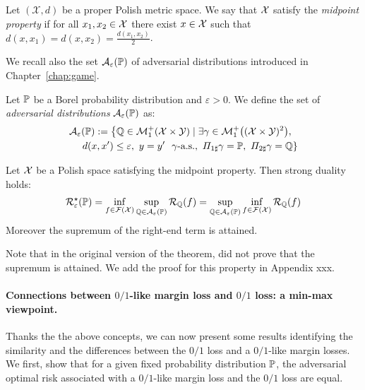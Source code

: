 \begin{definition}
Let $(\mathcal{X},d)$ be a proper Polish metric space. We say that $\mathcal{X}$ satisfy the \emph{midpoint property} if for all $x_1,x_2\in\mathcal{X}$ there exist $x\in\mathcal{X}$ such that $d(x,x_1) = d(x,x_2) =\frac{d(x_1,x_2)}{2}$.
\end{definition}
We recall also the set $\mathcal{A}_\varepsilon(\mathbb{P})$ of adversarial distributions introduced in Chapter~\ref{chap:game}.
\begin{definition}
Let $\mathbb{P}$ be a Borel probability distribution and $\varepsilon>0$.
We define the set of \emph{adversarial distributions} $\mathcal{A}_\varepsilon(\mathbb{P})$ as: 
\begin{align*}
\mathcal{A}_{\varepsilon}&(\PP) := \left\{\QQ\in\mathcal{M}^+_1(\mathcal{X}\times\mathcal{Y})\mid\exists \gamma\in\mathcal{M}^+_1\left((\mathcal{X}\times\mathcal{Y})^2\right),\right.\\
&\left.d(x,x')\leq\varepsilon,~y=y'~~ \gamma\text{-a.s.},~\Pi_{1\sharp}\gamma=\PP,~\Pi_{2\sharp}\gamma=\QQ\right\} 
\end{align*}

\end{definition}


\begin{thm}
Let $\mathcal{X}$ be a Polish space satisfying the midpoint property. Then strong duality holds:
\begin{align*}
\mathcal{R}^\star_\varepsilon(\mathbb{P}) = \inf_{f\in\mathcal{F}(\mathcal{X})}\sup_{\mathbb{Q}\in\mathcal{A}_\varepsilon(\mathbb{P})} \mathcal{R}_{\mathbb{Q}}(f) =    \sup_{\mathbb{Q}\in\mathcal{A}_\varepsilon(\mathbb{P})} \inf_{f\in\mathcal{F}(\mathcal{X})} \mathcal{R}_{\mathbb{Q}}(f)
\end{align*}
Moreover the supremum of the right-end term is attained. 
\end{thm}
Note that in the original version of the theorem, \citet{pydi2021many} did not prove that the supremum is attained. We add the proof for this property in Appendix xxx. 


\paragraph{Connections between $0/1$-like margin loss and $0/1$ loss: a min-max viewpoint.} Thanks the the above concepts, we can now present some results identifying the similarity and the differences between the  $0/1$ loss and a $0/1$-like margin losses. We first, show that for a given fixed probability distribution $\mathbb{P}$, the adversarial optimal risk associated with a $0/1$-like margin loss and the $0/1$ loss are equal.

